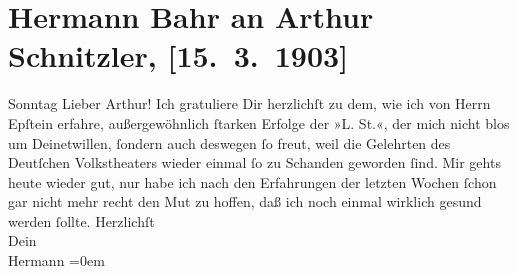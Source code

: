 

         
         \newcommand{\erwaehntePersonen}{Personen: Moritz Epstein}
         \newcommand{\erwaehnteOrte}{Orte: Volkstheater, Wien}
         \newcommand{\erwaehnteWerke}{Werke: Lebendige Stunden. Vier Einakter}
               \section[Hermann Bahr an Arthur Schnitzler, {[}15. 3. 1903{]}]{ Hermann Bahr an Arthur Schnitzler, {[}15. 3. 1903{]}}\nopagebreak{}\rehead{ }\begin{ledgroupsized}[t]{13cm}\normalsize\beginnumbering \toendnotes[C]{\smallbreak\pagebreak[2]} 
\pstart
           \raggedleft{}{\pb}Sonntag\pend
           \pstart\center{}Lieber Arthur!\pend\pstart
           Ich gratuliere Dir herzlichſt zu dem, wie ich von Herrn Epſtein erfahre, außergewöhnlich ſtarken Erfolge der »L. St.«, der mich nicht blos um Deinetwillen,
               ſondern auch deswegen ſo freut, weil die Gelehrten des Deutſchen Volkstheaters wieder einmal ſo zu Schanden geworden ſind.\pend
           \pstart
           Mir gehts heute wieder gut, nur habe ich nach den Erfahrungen der letzten Wochen
               ſchon gar nicht mehr recht den Mut zu hoffen, daß ich noch einmal wirklich gesund {\pb}werden ſollte.\pend
           \pstart
           Herzlichſt{\\[\baselineskip]}Dein{\\[\baselineskip]}\spacefill\mbox{Hermann}\pend
           \leftskip=0em{}
         
         \endnumbering{}\end{ledgroupsized}  \newcommand{\dateiname}{L01277}\newcommand{\titel}{Hermann Bahr an Arthur Schnitzler, [15. 3. 1903]}\newcommand{\editorInnen}{ Kurt Ifkovits,  Martin Anton Müller}
      